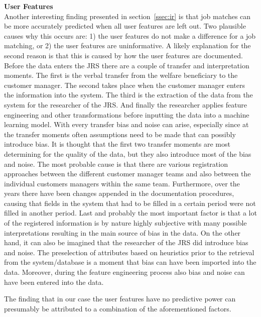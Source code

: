 \noindent
\textbf{User Features}\\
Another interesting finding presented in section~\ref{ssec:ir} is that job matches can be more accurately predicted when all user features are left out.  
Two plausible causes why this occurs are: 1) the user features do not make a difference for a job matching, or 2) the user features are uninformative.
A likely explanation for the second reason is that this is caused by how the user features are documented.
Before the data enters the JRS there are a couple of transfer and interpretation moments. 
The first is the verbal transfer from the welfare beneficiary to the customer manager.
The second takes place when the customer manager enters the information into the system.
The third is the extraction of the data from the system for the researcher of the JRS.
And finally the researcher applies feature engineering and other transformations before inputting the data into a machine learning model.
With every transfer bias and noise can arise, especially since at the transfer moments often assumptions need to be made that can possibly introduce bias.
It is thought that the first two transfer moments are most determining for the quality of the data, but they also introduce most of the bias and noise. The most probable cause is that there are various registration approaches between the different customer manager teams and also between the individual customers managers within the same team. 
Furthermore, over the years there have been changes appended in the documentation procedures, causing that fields in the system that had to be filled in a certain period were not filled  in another period.
Last and probably the most important factor is that a lot of the registered information is by nature highly subjective with many possible interpretations resulting in the main source of bias in the data. 
On the other hand, it can also be imagined that the researcher of the JRS did introduce bias and noise.
The preselection of attributes based on heuristics prior to the retrieval from the system/database is a moment that bias can have been imported into the data.
Moreover, during the feature engineering process also bias and noise can have been entered into the data.

The finding that in our case the user features have no predictive power can presumably be attributed to a combination of the aforementioned factors. 

